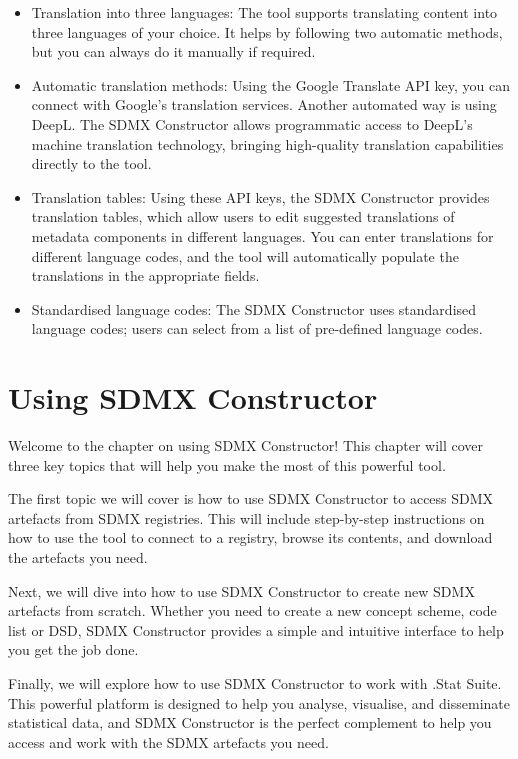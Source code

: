 \documentclass[
]{book}
\providecommand{\tightlist}{%
  \setlength{\itemsep}{0pt}\setlength{\parskip}{0pt}}
\theoremstyle{definition}
\theoremstyle{definition}
\theoremstyle{definition}
\theoremstyle{definition}
\theoremstyle{remark}
\begin{document}
\begin{itemize}
\tightlist
\item
  Translation into three languages: The tool supports translating content into three languages of your choice. It helps by following two automatic methods, but you can always do it manually if required.
\item
  Automatic translation methods: Using the Google Translate API key, you can connect with Google's translation services. Another automated way is using DeepL. The SDMX Constructor allows programmatic access to DeepL's machine translation technology, bringing high-quality translation capabilities directly to the tool.
\item
  Translation tables: Using these API keys, the SDMX Constructor provides translation tables, which allow users to edit suggested translations of metadata components in different languages. You can enter translations for different language codes, and the tool will automatically populate the translations in the appropriate fields.
\item
  Standardised language codes: The SDMX Constructor uses standardised language codes; users can select from a list of pre-defined language codes.
\end{itemize}

\hypertarget{using-sdmx}{%
\chapter{Using SDMX Constructor}\label{using-sdmx}}

Welcome to the chapter on using SDMX Constructor! This chapter will cover three key topics that will help you make the most of this powerful tool.

The first topic we will cover is how to use SDMX Constructor to access SDMX artefacts from SDMX registries. This will include step-by-step instructions on how to use the tool to connect to a registry, browse its contents, and download the artefacts you need.

Next, we will dive into how to use SDMX Constructor to create new SDMX artefacts from scratch. Whether you need to create a new concept scheme, code list or DSD, SDMX Constructor provides a simple and intuitive interface to help you get the job done.

Finally, we will explore how to use SDMX Constructor to work with .Stat Suite. This powerful platform is designed to help you analyse, visualise, and disseminate statistical data, and SDMX Constructor is the perfect complement to help you access and work with the SDMX artefacts you need.
\end{document}
